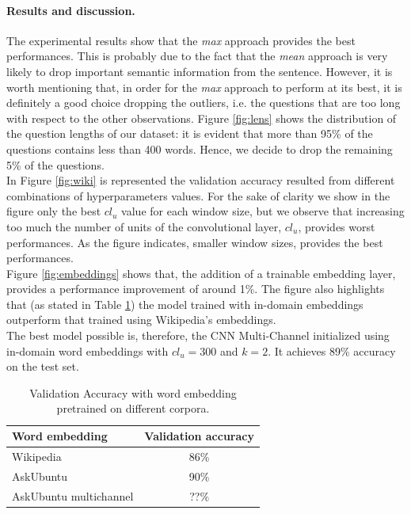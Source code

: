 \documentclass[10pt,twocolumn,letterpaper]{article}
\begin{document}
\paragraph{Results and discussion.}
The experimental results show that the \emph{max} approach provides the best performances. This is probably due to the fact that the \emph{mean} approach is very likely to drop important semantic information from the sentence. However, it is worth mentioning that, in order for the \emph{max} approach to perform at its best, it is  definitely a good choice dropping the outliers, i.e. the questions that are too long with respect to the other observations. Figure \ref{fig:lens} shows the distribution of the question lengths of our dataset: it is evident that more than 95\% of the questions contains less than 400 words. Hence, we decide to drop the remaining 5\% of the questions.\\
In Figure \ref{fig:wiki} is represented the validation accuracy resulted from different combinations of hyperparameters values. For the sake of clarity we show in the figure only the best $cl_{u}$ value for each window size, but we observe that increasing too much the number of units of the convolutional layer, $cl_{u}$, provides worst performances.  As the figure indicates, smaller window sizes, provides the best performances.\\
Figure \ref{fig:embeddings} shows that, the addition of a trainable embedding layer, provides a performance improvement of around 1\%. The figure also highlights that (as stated in Table \ref{table:accuracy}) the model trained with in-domain embeddings outperform that trained using Wikipedia's embeddings.\\
The best model possible is, therefore, the CNN Multi-Channel initialized using in-domain word embeddings with $cl_u=300$ and $k=2$. It achieves 89\% accuracy on the test set.
\begin{table}
\begin{center}
\begin{tabular}{|l|c|}
\hline
Word embedding & Validation accuracy \\
\hline
Wikipedia & 86\% \\
AskUbuntu & 90\% \\
AskUbuntu multichannel & ??\% \\
\hline
\end{tabular}
\end{center}
\caption{Validation Accuracy with word embedding pretrained on different corpora.}
\label{table:accuracy}
\end{table}
\end{document}
